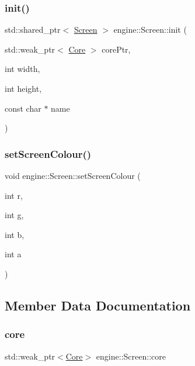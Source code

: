 \subsubsection{\texorpdfstring{init()}{init()}}
{\footnotesize\ttfamily std\+::shared\+\_\+ptr$<$ \mbox{\hyperlink{classengine_1_1_screen}{Screen}} $>$ engine\+::\+Screen\+::init (\begin{DoxyParamCaption}\item[{std\+::weak\+\_\+ptr$<$ \mbox{\hyperlink{classengine_1_1_core}{Core}} $>$}]{core\+Ptr,  }\item[{int}]{width,  }\item[{int}]{height,  }\item[{const char $\ast$}]{name }\end{DoxyParamCaption})\hspace{0.3cm}{\ttfamily [static]}}

\mbox{\label{classengine_1_1_screen_a43f6d5b65f4b07dc4354732d290ba67a}} 
\subsubsection{\texorpdfstring{set\+Screen\+Colour()}{setScreenColour()}}
{\footnotesize\ttfamily void engine\+::\+Screen\+::set\+Screen\+Colour (\begin{DoxyParamCaption}\item[{int}]{r,  }\item[{int}]{g,  }\item[{int}]{b,  }\item[{int}]{a }\end{DoxyParamCaption})}



\subsection{Member Data Documentation}
\mbox{\label{classengine_1_1_screen_ae27fce6edba72dcb68491e2e3708b133}} 
\subsubsection{\texorpdfstring{core}{core}}
{\footnotesize\ttfamily std\+::weak\+\_\+ptr$<$\mbox{\hyperlink{classengine_1_1_core}{Core}}$>$ engine\+::\+Screen\+::core\hspace{0.3cm}{\ttfamily [private]}}

